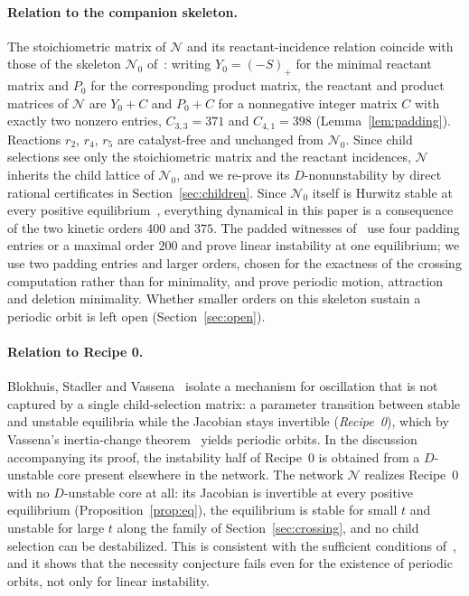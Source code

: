\documentclass[11pt,a4paper]{article}
\theoremstyle{plain}
\theoremstyle{definition}
\theoremstyle{remark}
\newcommand{\Sk}{\mathcal{N}_0}
\newcommand{\Osc}{\mathcal{N}}
\begin{document}
\paragraph{Relation to the companion skeleton.}
The stoichiometric matrix of $\Osc$ and its reactant-incidence relation coincide with those of the skeleton $\Sk$ of~\cite{ParameterRich2026,KineticOrder2026}: writing $Y_0=(-S)_+$ for the minimal reactant matrix and $P_0$ for the corresponding product matrix, the reactant and product matrices of $\Osc$ are $Y_0+C$ and $P_0+C$ for a nonnegative integer matrix $C$ with exactly two nonzero entries, $C_{3,3}=371$ and $C_{4,1}=398$ (Lemma~\ref{lem:padding}). Reactions $r_2$, $r_4$, $r_5$ are catalyst-free and unchanged from $\Sk$. Since child selections see only the stoichiometric matrix and the reactant incidences, $\Osc$ inherits the child lattice of $\Sk$, and we re-prove its $D$-nonunstability by direct rational certificates in Section~\ref{sec:children}. Since $\Sk$ itself is Hurwitz stable at every positive equilibrium~\cite[Theorem~5.2]{KineticOrder2026}, everything dynamical in this paper is a consequence of the two kinetic orders $400$ and $375$. The padded witnesses of~\cite{KineticOrder2026} use four padding entries or a maximal order $200$ and prove linear instability at one equilibrium; we use two padding entries and larger orders, chosen for the exactness of the crossing computation rather than for minimality, and prove periodic motion, attraction and deletion minimality. Whether smaller orders on this skeleton sustain a periodic orbit is left open (Section~\ref{sec:open}).

\paragraph{Relation to Recipe 0.}
Blokhuis, Stadler and Vassena~\cite[\S2.3]{BSV2025} isolate a mechanism for oscillation that is not captured by a single child-selection matrix: a parameter transition between stable and unstable equilibria while the Jacobian stays invertible (\emph{Recipe~0}), which by Vassena's inertia-change theorem~\cite[Theorem~5.2]{Vassena2025Hopf} yields periodic orbits. In the discussion accompanying its proof, the instability half of Recipe~0 is obtained from a $D$-unstable core present elsewhere in the network. The network $\Osc$ realizes Recipe~0 with no $D$-unstable core at all: its Jacobian is invertible at every positive equilibrium (Proposition~\ref{prop:eq}), the equilibrium is stable for small $t$ and unstable for large $t$ along the family of Section~\ref{sec:crossing}, and no child selection can be destabilized. This is consistent with the sufficient conditions of~\cite{BSV2025}, and it shows that the necessity conjecture fails even for the existence of periodic orbits, not only for linear instability.
\end{document}
